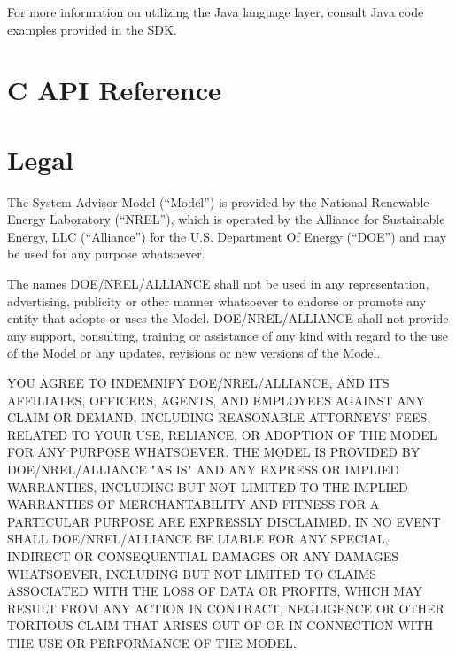 \documentclass{article}
\begin{document}
For more information on utilizing the Java language layer, consult Java code examples provided in the SDK.  


\section{C API Reference}
\label{sec_api_ref}


\section{Legal}

The System Advisor Model (``Model'') is provided by the National Renewable Energy Laboratory (``NREL''), which is operated by the Alliance for Sustainable Energy, LLC (``Alliance'') for the U.S. Department Of Energy (``DOE'') and may be used for any purpose whatsoever.  

The names DOE/NREL/ALLIANCE shall not be used in any representation, advertising, publicity or other manner whatsoever to endorse or promote any entity that adopts or uses the Model.  DOE/NREL/ALLIANCE shall not provide any support, consulting, training or assistance of any kind with regard to the use of the Model or any updates, revisions or new versions of the Model.

YOU AGREE TO INDEMNIFY DOE/NREL/ALLIANCE, AND ITS AFFILIATES, OFFICERS, AGENTS, AND EMPLOYEES AGAINST ANY CLAIM OR DEMAND, INCLUDING REASONABLE ATTORNEYS' FEES, RELATED TO YOUR USE, RELIANCE, OR ADOPTION OF THE MODEL FOR ANY PURPOSE WHATSOEVER.  THE MODEL IS PROVIDED BY DOE/NREL/ALLIANCE "AS IS" AND ANY EXPRESS OR IMPLIED WARRANTIES, INCLUDING BUT NOT LIMITED TO THE IMPLIED WARRANTIES OF MERCHANTABILITY AND FITNESS FOR A PARTICULAR PURPOSE ARE EXPRESSLY DISCLAIMED.  IN NO EVENT SHALL DOE/NREL/ALLIANCE BE LIABLE FOR ANY SPECIAL, INDIRECT OR CONSEQUENTIAL DAMAGES OR ANY DAMAGES WHATSOEVER, INCLUDING BUT NOT LIMITED TO CLAIMS ASSOCIATED WITH THE LOSS OF DATA OR PROFITS, WHICH MAY RESULT FROM ANY ACTION IN CONTRACT, NEGLIGENCE OR OTHER TORTIOUS CLAIM THAT ARISES OUT OF OR IN CONNECTION WITH THE USE OR PERFORMANCE OF THE MODEL.
\end{document}
